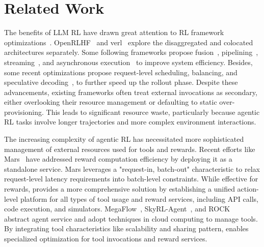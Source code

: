 \section{Related Work}

The benefits of LLM RL have drawn great attention to RL framework optimizations~\citep{yao2023deepspeed,sheng2025hybridflow,hu2024openrlhf,zhong2025optimizing,zhong2025streamrl,fu2025areal,he2025history,wang2025distflow,lei2024puzzle,shen2024nemo,han2025asyncflow}.
OpenRLHF~\citep{hu2024openrlhf} and verl~\citep{sheng2025hybridflow} explore the disaggregated and colocated architectures separately.
Some following frameworks propose fusion~\citep{zhong2025optimizing}, pipelining~\citep{zhong2025optimizing}, streaming~\citep{zhong2025streamrl}, and asynchronous execution~\citep{fu2025areal} to improve system efficiency.
Besides, some recent optimizations propose request-level scheduling, balancing, and speculative decoding~\citep{gao2025rollpacker,jinefficient},  to further speed up the rollout phase.
Despite these advancements, existing frameworks often treat external invocations as secondary, either overlooking their resource management or defaulting to static over-provisioning. 
This leads to significant resource waste, particularly because agentic RL tasks involve longer trajectories and more complex environment interactions.

The increasing complexity of agentic RL has necessitated more sophisticated management of external resources used for tools and rewards.
Recent efforts like Mars~\citep{zhu2026mars} have addressed reward computation efficiency by deploying it as a standalone service.
Mars leverages a "request-in, batch-out" characteristic to relax request-level latency requirements into batch-level constraints.
While effective for rewards, \sysname provides a more comprehensive solution by establishing a unified action-level platform for all types of tool usage and reward services, including API calls, code execution, and simulators.
MegaFlow~\citep{zhang2026megaflow}, SkyRL-Agent~\citep{cao2025skyrl}, and ROCK~\citep{wang2025let} abstract agent service and adopt techniques in cloud computing to manage tools.
By integrating tool characteristics like scalability and sharing pattern, \sysname enables specialized optimization for tool invocations and reward services.

